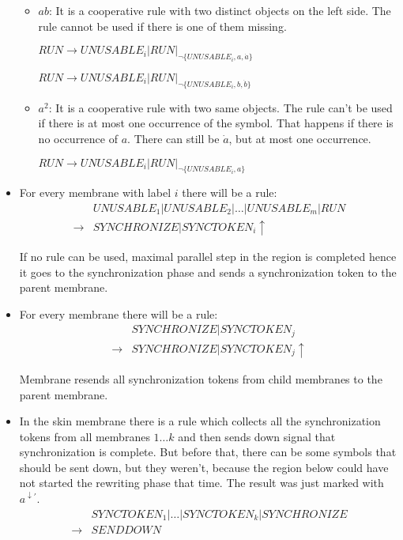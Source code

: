\begin{dokaz}
\begin{itemize}
\begin{itemize}
      \item $ab$: It is a cooperative rule with two distinct objects on the left side. The rule cannot be used if there is one of them missing.

      $\mathit{RUN} \rightarrow \mathit{UNUSABLE_i}|\mathit{RUN}|_{\neg\{\mathit{UNUSABLE_i}, a, \dot{a}\}}$

      $\mathit{RUN} \rightarrow \mathit{UNUSABLE_i}|\mathit{RUN}|_{\neg\{\mathit{UNUSABLE_i}, b, \dot{b}\}}$

      \item $a^2$: It is a cooperative rule with two same objects. The rule can't be used if there is at most one occurrence of the symbol. That happens if there is no occurrence of $a$. There can still be $\dot{a}$, but at most one occurrence.

      $\mathit{RUN} \rightarrow \mathit{UNUSABLE_i}|\mathit{RUN}|_{\neg\{\mathit{UNUSABLE_i}, a\}}$
    \end{itemize}

    \item For every membrane with label $i$ there will be a rule:
    \begin{align*}
      &\mathit{UNUSABLE_1}|\mathit{UNUSABLE_2}|\dots|\mathit{UNUSABLE_m}|\mathit{RUN} \\
      \rightarrow &\mathit{SYNCHRONIZE}|\mathit{SYNCTOKEN_i}\uparrow
    \end{align*}

    If no rule can be used, maximal parallel step in the region is completed hence it goes to the synchronization phase and sends a synchronization token to the parent membrane.

    \item For every membrane there will be a rule:
    \begin{align*}
      &\mathit{SYNCHRONIZE}|\mathit{SYNCTOKEN_j} \\
      \rightarrow &\mathit{SYNCHRONIZE}|\mathit{SYNCTOKEN_j}\uparrow
    \end{align*}

    Membrane resends all synchronization tokens from child membranes to the parent membrane.

    \item In the skin membrane there is a rule which collects all the synchronization tokens from all membranes $1\dots k$ and then sends down signal that synchronization is complete. But before that, there can be some symbols that should be sent down, but they weren't, because the region below could have not started the rewriting phase that time. The result was just marked with $a^{\downarrow\prime}$.
    \begin{align*}
      &\mathit{SYNCTOKEN_1}|\dots|\mathit{SYNCTOKEN_k}|\mathit{SYNCHRONIZE} \\
      \rightarrow &\mathit{SENDDOWN}
    \end{align*}


\end{itemize}
\end{dokaz}
